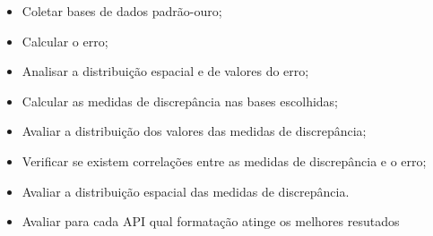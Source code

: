 \begin{itemize}
   \item Coletar bases de dados padrão-ouro;
   \item Calcular o erro;
   \item Analisar a distribuição espacial e de valores do erro;
   \item Calcular as medidas de discrepância nas bases escolhidas;
   \item Avaliar a distribuição dos valores das medidas de discrepância;
   \item Verificar se existem correlações entre as medidas de discrepância e o erro;
   \item Avaliar a distribuição espacial das medidas de discrepância. 
   \item Avaliar para cada API qual formatação atinge os melhores resutados
\end{itemize}

